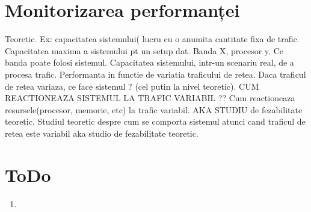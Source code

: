 \documentclass[12pt, a4paper, twoside, romanian]{teza-upb}
\begin{document}
    \chapter{Monitorizarea performanței}
        Teoretic. Ex: capacitatea sistemului( lucru cu o anumita cantitate fixa de trafic. Capacitatea maxima a sistemului pt un setup dat. Banda X, procesor y. Ce banda poate folosi sistemul.  Capacitatea sistemului, intr-un scenariu real, de a procesa trafic. Performanta in functie de variatia traficului de retea. Daca traficul de retea variaza, ce face sistemul ? (cel putin la nivel teoretic). CUM REACTIONEAZA SISTEMUL LA TRAFIC VARIABIL ?? Cum reactioneaza resursele(procesor, memorie, etc) la trafic variabil. AKA STUDIU de fezabilitate teoretic.
        Studiul teoretic despre cum se comporta sistemul atunci cand traficul de retea este variabil aka studio de fezabilitate teoretic.

    \chapter{ToDo}
    \begin{enumerate}
        \item
    \end{enumerate}
\end{document}
